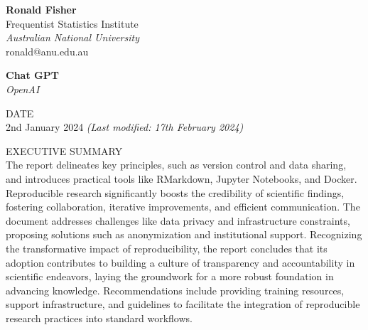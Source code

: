 \documentclass[
  a4paper,
  oneside,
  open=any]{scrbook}
\begin{document}
\begin{frontmatter}
\begin{titlepage}
\begin{minipage}[b][\textheight][s]{\textwidth}
\begin{titlepagebox}
\begin{multicols}{2}
\begin{minipage}{\columnwidth}
      
      \vspace{4mm}
      \end{minipage}

      \begin{minipage}{\columnwidth}
      \raggedright
      \normalfont
      {\textbf{Ronald Fisher}}\\
          {Frequentist Statistics Institute}\\
      {\itshape{Australian National University}}\\
           ronald@anu.edu.au\\
      
      
      \vspace{4mm}
      \end{minipage}

      \begin{minipage}{\columnwidth}
      \raggedright
      \normalfont
      {\textbf{Chat GPT}}\\
          
      {\itshape{OpenAI}}\\
          
      
      
      \vspace{4mm}
      \end{minipage}

  \end{multicols}

  \vspace{-4mm}


  {\textcolor{anugold}{\MakeUppercase{Date}}}\\ 2nd January 2024
  {\itshape{(Last modified: 17th February 2024)}}
  \vspace{3mm}

  \textcolor{anugold}{\MakeUppercase{Executive Summary}}\\
  The report delineates key principles, such as version control and data
  sharing, and introduces practical tools like RMarkdown, Jupyter
  Notebooks, and Docker. Reproducible research significantly boosts the
  credibility of scientific findings, fostering collaboration, iterative
  improvements, and efficient communication. The document addresses
  challenges like data privacy and infrastructure constraints, proposing
  solutions such as anonymization and institutional support. Recognizing
  the transformative impact of reproducibility, the report concludes
  that its adoption contributes to building a culture of transparency
  and accountability in scientific endeavors, laying the groundwork for
  a more robust foundation in advancing knowledge. Recommendations
  include providing training resources, support infrastructure, and
  guidelines to facilitate the integration of reproducible research
  practices into standard workflows.
  \vspace{3mm}


\end{titlepagebox}
\end{minipage}
\end{titlepage}
\end{frontmatter}
\end{document}
